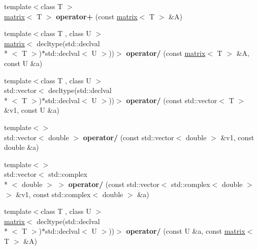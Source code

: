 \begin{DoxyCompactItemize}
\item 
\hypertarget{namespacekeycpp_a5b10f703c72875b9f5e2ecc5c7696f9c}{{\footnotesize template$<$class T $>$ }\\\hyperlink{classkeycpp_1_1matrix}{matrix}$<$ T $>$ {\bfseries operator+} (const \hyperlink{classkeycpp_1_1matrix}{matrix}$<$ T $>$ \&A)}\label{namespacekeycpp_a5b10f703c72875b9f5e2ecc5c7696f9c}

\item 
\hypertarget{namespacekeycpp_a3852c35cfcc8caa784465a26d04c68a1}{{\footnotesize template$<$class T , class U $>$ }\\\hyperlink{classkeycpp_1_1matrix}{matrix}$<$ decltype(std\-::declval\\*
$<$ T $>$)$\ast$std\-::declval$<$ U $>$))$>$ {\bfseries operator/} (const \hyperlink{classkeycpp_1_1matrix}{matrix}$<$ T $>$ \&A, const U \&a)}\label{namespacekeycpp_a3852c35cfcc8caa784465a26d04c68a1}

\item 
\hypertarget{namespacekeycpp_a394f23f09cf122a8e8c20a7afd40f58e}{{\footnotesize template$<$class T , class U $>$ }\\std\-::vector$<$ decltype(std\-::declval\\*
$<$ T $>$)$\ast$std\-::declval$<$ U $>$))$>$ {\bfseries operator/} (const std\-::vector$<$ T $>$ \&v1, const U \&a)}\label{namespacekeycpp_a394f23f09cf122a8e8c20a7afd40f58e}

\item 
\hypertarget{namespacekeycpp_aec485bbc5951a7ea82206c5f401412aa}{{\footnotesize template$<$$>$ }\\std\-::vector$<$ double $>$ {\bfseries operator/} (const std\-::vector$<$ double $>$ \&v1, const double \&a)}\label{namespacekeycpp_aec485bbc5951a7ea82206c5f401412aa}

\item 
\hypertarget{namespacekeycpp_aa6089577ac7b51e05fb96725fbada7ba}{{\footnotesize template$<$$>$ }\\std\-::vector$<$ std\-::complex\\*
$<$ double $>$ $>$ {\bfseries operator/} (const std\-::vector$<$ std\-::complex$<$ double $>$$>$ \&v1, const std\-::complex$<$ double $>$ \&a)}\label{namespacekeycpp_aa6089577ac7b51e05fb96725fbada7ba}

\item 
\hypertarget{namespacekeycpp_aafc0089bdf204385c1e627755c5070b0}{{\footnotesize template$<$class T , class U $>$ }\\\hyperlink{classkeycpp_1_1matrix}{matrix}$<$ decltype(std\-::declval\\*
$<$ T $>$)$\ast$std\-::declval$<$ U $>$))$>$ {\bfseries operator/} (const U \&a, const \hyperlink{classkeycpp_1_1matrix}{matrix}$<$ T $>$ \&A)}\label{namespacekeycpp_aafc0089bdf204385c1e627755c5070b0}


\end{DoxyCompactItemize}
